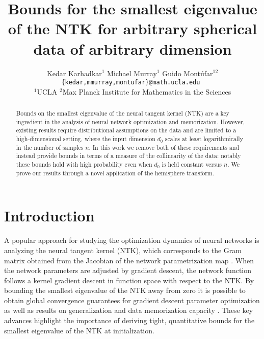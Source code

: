 \documentclass{article}
\title{Bounds for the smallest eigenvalue of the NTK for arbitrary spherical data of arbitrary dimension}
\author{Kedar Karhadkar$^{1}$ \quad Michael Murray$^{1}$ \quad Guido Mont\'ufar$^{12}$\\
\texttt{\{kedar,mmurray,montufar\}@math.ucla.edu }\\
$^1$UCLA \quad $^2$Max Planck Institute for Mathematics in the Sciences}
\theoremstyle{definition}
\begin{document}
\maketitle


\begin{abstract}
Bounds on the smallest eigenvalue of the neural tangent kernel (NTK) are a key ingredient in the analysis of neural network optimization and memorization. However, existing results require distributional assumptions on the data and are limited to a high-dimensional setting, where the input dimension $d_0$ scales at least logarithmically in the number of samples $n$. In this work we remove both of these requirements and instead provide bounds in terms of a measure of the collinearity of the data: notably these bounds hold with high probability even when $d_0$ is held constant versus $n$. We prove our results through a novel application of the hemisphere transform.
\end{abstract}

\section{Introduction} 

A popular approach for studying the optimization dynamics of neural networks is analyzing the neural tangent kernel (NTK), which corresponds to the Gram matrix obtained from the Jacobian of the network parametrization map \citep{jacot2018neural}. 
When the network parameters are adjusted by gradient descent, the network function follows a kernel gradient descent in function space with respect to the NTK. 
By bounding the smallest eigenvalue of the NTK away from zero it is 
possible to obtain global convergence guarantees for gradient descent parameter optimization \citep{du2018gradient,Oymak2019TowardMO} as well as results on generalization \citep{pmlr-v97-arora19a,montanari2022interpolation}
and data memorization capacity \citep{montanari2022interpolation,nguyen2021tight,bombari2022memorization}. 
These key advances highlight the importance of deriving tight, quantitative bounds for the smallest eigenvalue of the NTK at initialization. 
\end{document}
